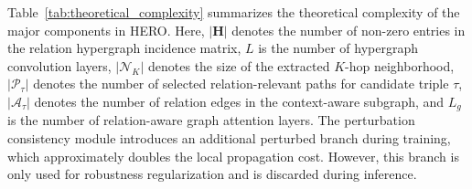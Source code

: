 \documentclass[pdflatex,sn-mathphys-num]{sn-jnl}
\begin{document}
Table~\ref{tab:theoretical_complexity} summarizes the theoretical complexity of the major components in HERO. Here, $|\mathbf{H}|$ denotes the number of non-zero entries in the relation hypergraph incidence matrix, $L$ is the number of hypergraph convolution layers, $|\mathcal{N}_{K}|$ denotes the size of the extracted $K$-hop neighborhood, $|\mathcal{P}_{\tau}|$ denotes the number of selected relation-relevant paths for candidate triple $\tau$, $|\mathcal{A}_{\tau}|$ denotes the number of relation edges in the context-aware subgraph, and $L_g$ is the number of relation-aware graph attention layers. The perturbation consistency module introduces an additional perturbed branch during training, which approximately doubles the local propagation cost. However, this branch is only used for robustness regularization and is discarded during inference.

\begin{table}[t]
\centering
\caption{Model size and memory consumption on three datasets. Params denotes the number of trainable parameters. GPU memory is measured during training under the same batch size setting.}
\label{tab:params_memory}
\end{table}
\end{document}
